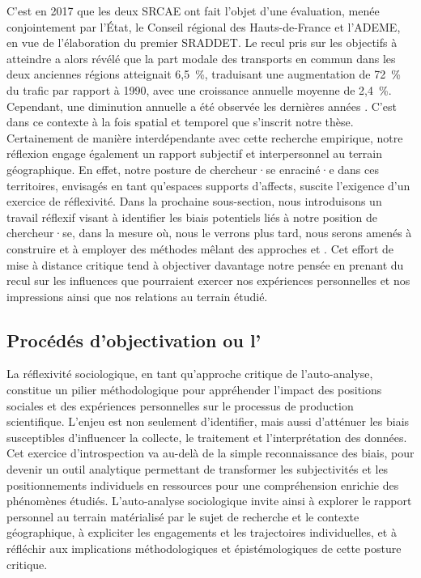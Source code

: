 \begin{refsegment}
C'est en 2017 que les deux \acrshort{SRCAE} ont fait l’objet d’une évaluation, menée conjointement par l’État, le Conseil régional des Hauts-de-France et l’\acrfull{ADEME}, en vue de l’élaboration du premier \acrshort{SRADDET}. Le recul pris sur les objectifs à atteindre a alors révélé que la part modale des transports en commun dans les deux anciennes régions atteignait 6,5~\%, traduisant une augmentation de 72~\% du trafic par rapport à 1990, avec une croissance annuelle moyenne de 2,4~\%. Cependant, une diminution annuelle a été observée les dernières années \textcolor{blue}{\autocite[164]{region_hauts-de-france_evaluation_2017}}. C’est dans ce contexte à la fois spatial et temporel que s’inscrit notre thèse. Certainement de manière interdépendante avec cette recherche empirique, notre réflexion engage également un rapport subjectif et interpersonnel au terrain géographique. En effet, notre posture de chercheur·se enraciné·e dans ces territoires, envisagés en tant qu’espaces supports d'affects, suscite l'exigence d’un exercice de réflexivité. Dans la prochaine sous-section, nous introduisons un travail réflexif visant à identifier les biais potentiels liés à notre position de chercheur·se, dans la mesure où, nous le verrons plus tard, nous serons amenés à construire et à employer des méthodes mêlant des approches  et . Cet effort de mise à distance critique tend à objectiver davantage notre pensée en prenant du recul sur les influences que pourraient exercer nos expériences personnelles et nos impressions ainsi que nos relations au terrain étudié.%

\subsection{Procédés d'objectivation ou l'
    \label{chap3:auto-analyse-sociologique}
    }

La réflexivité sociologique, en tant qu’approche critique de l'auto-analyse, constitue un pilier méthodologique pour appréhender l’impact des positions sociales et des expériences personnelles sur le processus de production scientifique. L'enjeu est non seulement d'identifier, mais aussi d'atténuer les biais susceptibles d’influencer la collecte, le traitement et l'interprétation des données. Cet exercice d'introspection va au-delà de la simple reconnaissance des biais, pour devenir un outil analytique permettant de transformer les subjectivités et les positionnements individuels en ressources pour une compréhension enrichie des phénomènes étudiés. L'auto-analyse sociologique invite ainsi à explorer le rapport personnel au terrain matérialisé par le sujet de recherche et le contexte géographique, à expliciter les engagements et les trajectoires individuelles, et à réfléchir aux implications méthodologiques et épistémologiques de cette posture critique.%


\end{refsegment}

